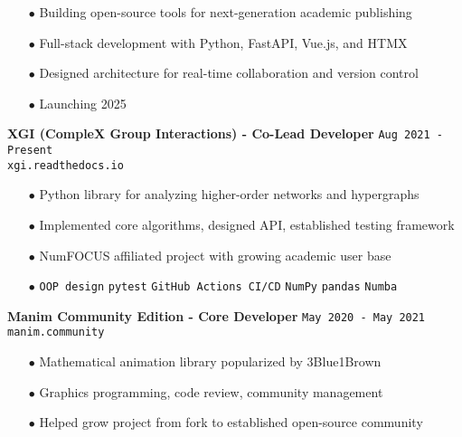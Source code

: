 \documentclass[11pt,a4paper]{article}
\newcommand{\verdigrisbullet}{{\color{verdigris}$\bullet$}\space}
\newcommand{\techtag}[1]{%
    \textcolor{verdigris}{\texttt{\small #1}}%
}
\newcommand{\jobduration}[1]{%
    \textcolor{mediumgray}{\texttt{\small #1}}%
}
\begin{document}
\begin{itemize}[leftmargin=15pt,itemsep=3pt]
    \item[\verdigrisbullet] Building open-source tools for next-generation academic publishing
    \item[\verdigrisbullet] Full-stack development with Python, FastAPI, Vue.js, and HTMX
    \item[\verdigrisbullet] Designed architecture for real-time collaboration and version control
    \item[\verdigrisbullet] Launching 2025
\end{itemize}

\vspace{6pt}

\textbf{\large\color{navy}XGI (CompleX Group Interactions) - Co-Lead Developer} \hfill \jobduration{Aug 2021 - Present}\\
{\textcolor{verdigris}{\texttt{xgi.readthedocs.io}}}

\begin{itemize}[leftmargin=15pt,itemsep=3pt]
    \item[\verdigrisbullet] Python library for analyzing higher-order networks and hypergraphs
    \item[\verdigrisbullet] Implemented core algorithms, designed API, established testing framework
    \item[\verdigrisbullet] NumFOCUS affiliated project with growing academic user base
    \item[\verdigrisbullet] \techtag{OOP design} \techtag{pytest} \techtag{GitHub Actions CI/CD} \techtag{NumPy} \techtag{pandas} \techtag{Numba}
\end{itemize}

\vspace{6pt}

\textbf{\large\color{navy}Manim Community Edition - Core Developer} \hfill \jobduration{May 2020 - May 2021}\\
{\textcolor{verdigris}{\texttt{manim.community}}}

\begin{itemize}[leftmargin=15pt,itemsep=3pt]
    \item[\verdigrisbullet] Mathematical animation library popularized by 3Blue1Brown
    \item[\verdigrisbullet] Graphics programming, code review, community management
    \item[\verdigrisbullet] Helped grow project from fork to established open-source community
\end{itemize}
\end{document}
